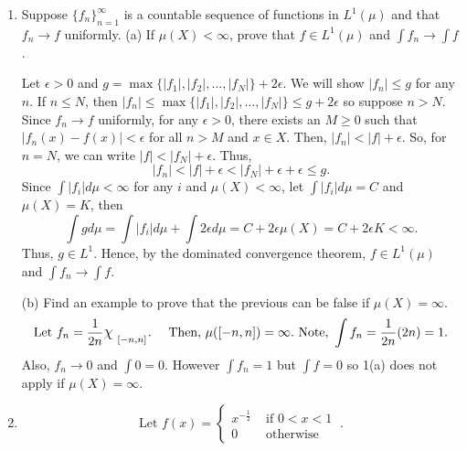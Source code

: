 \begin{enumerate}
\item Suppose $\{ f_n\}_{n=1}^\infty$ is a countable sequence of functions in $L^1(\mu)$ and that $f_n \rightarrow f$ uniformly.
\subitem(a) If $\mu(X)< \infty$, prove that $f \in L^1(\mu)$ and $\int f_n \rightarrow \int f$. 
\begin{pf}
Let $\epsilon>0$ and $g= \max\{|f_1|, |f_2|, \dots, |f_N|\}+2\epsilon$. We will show $|f_n|\leq g$	for any $n$. If $n \leq N$, then $|f_n|\leq \max\{|f_1|, |f_2|, \dots, |f_N|\}\leq g + 2\epsilon$ so suppose $n > N$. Since $f_n \rightarrow f$ uniformly, for any $\epsilon>0$, there exists an $M \geq 0$ such that $|f_n(x)-f(x)|< \epsilon$ for all $n>M$ and $x \in X$. Then, $|f_n|< |f| + \epsilon$. So, for $n=N$, we can write $|f|< |f_N| + \epsilon$. Thus,
\[
|f_n|< |f| + \epsilon<|f_N| + \epsilon+ \epsilon \leq g.
\]
Since $\int |f_i| d\mu < \infty$ for any $i$ and $\mu(X)<\infty$, let $\int |f_i| d\mu =C$ and $\mu(X)=K$, then  
\[
\int g d\mu = \int |f_i| d\mu + \int 2\epsilon d\mu =C+2\epsilon\mu(X)=C+2\epsilon K < \infty. 
\]
Thus, $g \in L^1$. Hence, by the dominated convergence theorem, $f \in L^1(\mu)$ and $\int f_n \rightarrow \int f$. 
\end{pf}

\subitem(b) Find an example to prove that the previous can be false if $\mu(X) = \infty$. 
 \[
\text{Let } f_n =\frac{1}{2n} \mathlarger{\chi}_{\ _\mathlarger{[-n,n]}} .\quad \text{ Then, } \mu([-n,n])=\infty. \text{ Note, } \int f_n = \frac{1}{2n}(2n)=1. 
\]
Also, $f_n \rightarrow 0$ and $\int 0 = 0$. However $\int f_n = 1$ but $\int f = 0$ so 1(a) does not apply if $\mu(X) = \infty$. 
\item \[ \text{Let } f(x) = \left\{
\begin{array}{ll}
x^{-\frac{1}{2}} & \text{ if } 0 < x< 1\\
0 & \text{ otherwise} 	
\end{array} \right.\ .
\]
 

\end{enumerate}

